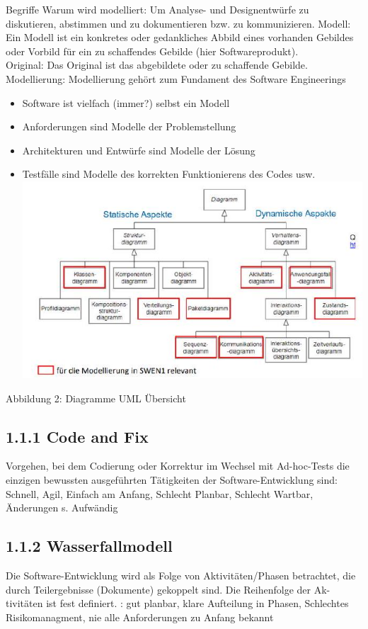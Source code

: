 \documentclass[10pt]{article}
\begin{document}
Begriffe Warum wird modelliert: Um Analyse- und Designentwürfe zu diskutieren, abstimmen und zu dokumentieren bzw. zu kommunizieren. Modell: Ein Modell ist ein konkretes oder gedankliches Abbild eines vorhanden Gebildes oder Vorbild für ein zu schaffendes Gebilde (hier Softwareprodukt).\\
Original: Das Original ist das abgebildete oder zu schaffende Gebilde.\\
Modellierung: Modellierung gehört zum Fundament des Software Engineerings

\begin{itemize}
  \item Software ist vielfach (immer?) selbst ein Modell
  \item Anforderungen sind Modelle der Problemstellung
  \item Architekturen und Entwürfe sind Modelle der Lösung
  \item Testfälle sind Modelle des korrekten Funktionierens des Codes usw.\\
\includegraphics[max width=\textwidth, center]{2024_12_29_0d1d7b5551ea1b4b41bdg-01(1)}
\end{itemize}

Abbildung 2: Diagramme UML Übersicht

\subsection*{1.1.1 Code and Fix}
Vorgehen, bei dem Codierung oder Korrektur im Wechsel mit Ad-hoc-Tests die einzigen bewussten ausgeführten Tätigkeiten der Software-Entwicklung sind: Schnell, Agil, Einfach am Anfang, Schlecht Planbar, Schlecht Wartbar, Änderungen s. Aufwändig

\subsection*{1.1.2 Wasserfallmodell}
Die Software-Entwicklung wird als Folge von Aktivitäten/Phasen betrachtet, die durch Teilergebnisse (Dokumente) gekoppelt sind. Die Reihenfolge der Ak-\\
tivitäten ist fest definiert. : gut planbar, klare Aufteilung in Phasen, Schlechtes Risikomanagment, nie alle Anforderungen zu Anfang bekannt
\end{document}
